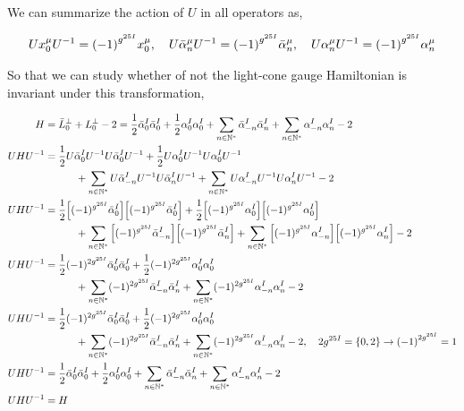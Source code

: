 We can summarize the action of $U$ in all operators as,

\begin{align*}
    Ux_0^\mu U^{-1}=\qty(-1)^{g^{25 I}}x_0^\mu,\ \ \ U{\bar\alpha}_n^\mu U^{-1}=\qty(-1)^{g^{25 I}}{\bar\alpha}_n^\mu,\ \ \ U\alpha_n^\mu U^{-1}=\qty(-1)^{g^{25 I}}\alpha_n^\mu
\end{align*}

So that we can study whether of not the light-cone gauge Hamiltonian is invariant under this transformation,

\begin{align*}
    H&={\bar L}_0^\perp+L_0^\perp-2=\frac12{\bar\alpha}_0^I{\bar\alpha}_0^I+\frac12{\alpha}_0^I{\alpha}_0^I+\sum\limits_{n\in\mathbb N^\ast}{\bar\alpha}_{-n}^I{\bar\alpha}_{n}^I+\sum\limits_{n\in\mathbb N^\ast}{\alpha}_{-n}^I{\alpha}_{n}^I-2\\
    UHU^{-1}&=\frac12U{\bar\alpha}_0^IU^{-1}U{\bar\alpha}_0^IU^{-1}+\frac12U{\alpha}_0^IU^{-1}U{\alpha}_0^IU^{-1}\\
    &\quad\quad\quad+\sum\limits_{n\in\mathbb N^\ast}U{\bar\alpha}_{-n}^IU^{-1}U{\bar\alpha}_{n}^IU^{-1}+\sum\limits_{n\in\mathbb N^\ast}U{\alpha}_{-n}^IU^{-1}U{\alpha}_{n}^IU^{-1}-2\\
    UHU^{-1}&=\frac12\qty[(-1)^{g^{25I}}{\bar\alpha}_0^I]\qty[(-1)^{g^{25I}}{\bar\alpha}_0^I]+\frac12\qty[(-1)^{g^{25I}}{\alpha}_0^I]\qty[(-1)^{g^{25I}}{\alpha}_0^I]\\
    &\quad\quad\quad+\sum\limits_{n\in\mathbb N^\ast}\qty[(-1)^{g^{25I}}{\bar\alpha}_{-n}^I]\qty[(-1)^{g^{25I}}{\bar\alpha}_{n}^I]+\sum\limits_{n\in\mathbb N^\ast}\qty[(-1)^{g^{25I}}{\alpha}_{-n}^I]\qty[(-1)^{g^{25I}}{\alpha}_{n}^I]-2\\
    UHU^{-1}&=\frac12(-1)^{2g^{25I}}{\bar\alpha}_0^I{\bar\alpha}_0^I+\frac12(-1)^{2g^{25I}}{\alpha}_0^I{\alpha}_0^I\\
    &\quad\quad\quad+\sum\limits_{n\in\mathbb N^\ast}(-1)^{2g^{25I}}{\bar\alpha}_{-n}^I{\bar\alpha}_{n}^I+\sum\limits_{n\in\mathbb N^\ast}(-1)^{2g^{25I}}{\alpha}_{-n}^I{\alpha}_{n}^I-2\\
    UHU^{-1}&=\frac12(-1)^{2g^{25I}}{\bar\alpha}_0^I{\bar\alpha}_0^I+\frac12(-1)^{2g^{25I}}{\alpha}_0^I{\alpha}_0^I\\
    &\quad\quad\quad+\sum\limits_{n\in\mathbb N^\ast}(-1)^{2g^{25I}}{\bar\alpha}_{-n}^I{\bar\alpha}_{n}^I+\sum\limits_{n\in\mathbb N^\ast}(-1)^{2g^{25I}}{\alpha}_{-n}^I{\alpha}_{n}^I-2,\ \ \ 2g^{25 I}=\qty{0,2}\rightarrow \qty(-1)^{2g^{25I}}=1\\
    UHU^{-1}&=\frac12{\bar\alpha}_0^I{\bar\alpha}_0^I+\frac12{\alpha}_0^I{\alpha}_0^I+\sum\limits_{n\in\mathbb N^\ast}{\bar\alpha}_{-n}^I{\bar\alpha}_{n}^I+\sum\limits_{n\in\mathbb N^\ast}{\alpha}_{-n}^I{\alpha}_{n}^I-2\\
    UHU^{-1}&=H
\end{align*}

